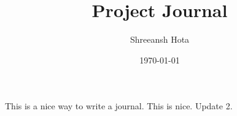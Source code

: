 \documentclass{article}
\title{Project Journal}
\author{Shreeansh Hota}
\date{\today}
\begin{document}
\maketitle

This is a nice way to write a journal. This is nice. Update 2.
\end{document}
